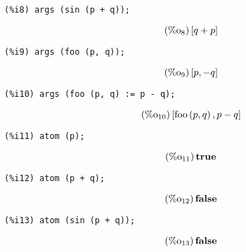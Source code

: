 \documentclass[12pt,leqno]{article}
\begin{document}
\begin{enumerate}
\begin{verbatim}
(%i8) args (sin (p + q));
\end{verbatim}
\begin{equation}
\tag{$\mathop{\mathrm{\%o}_{8}}$}\left[q+p\right]
\label{eq:doc-group1-code10-8-1}
\end{equation}
\begin{verbatim}
(%i9) args (foo (p, q));
\end{verbatim}
\begin{equation}
\tag{$\mathop{\mathrm{\%o}_{9}}$}\left[p, -q\right]
\label{eq:doc-group1-code10-9-1}
\end{equation}
\begin{verbatim}
(%i10) args (foo (p, q) := p - q);
\end{verbatim}
\begin{equation}
\tag{$\mathop{\mathrm{\%o}_{10}}$}\left[\mathop{\mathrm{foo}}\left(p, q\right), p-q\right]
\label{eq:doc-group1-code10-10-1}
\end{equation}
\begin{verbatim}
(%i11) atom (p);
\end{verbatim}
\begin{equation}
\tag{$\mathop{\mathrm{\%o}_{11}}$}\mathop{\mathbf{true}}
\label{eq:doc-group1-code10-11-1}
\end{equation}
\begin{verbatim}
(%i12) atom (p + q);
\end{verbatim}
\begin{equation}
\tag{$\mathop{\mathrm{\%o}_{12}}$}\mathop{\mathbf{false}}
\label{eq:doc-group1-code10-12-1}
\end{equation}
\begin{verbatim}
(%i13) atom (sin (p + q));
\end{verbatim}
\begin{equation}
\tag{$\mathop{\mathrm{\%o}_{13}}$}\mathop{\mathbf{false}}
\label{eq:doc-group1-code10-13-1}
\end{equation}



\end{enumerate}
\end{document}
